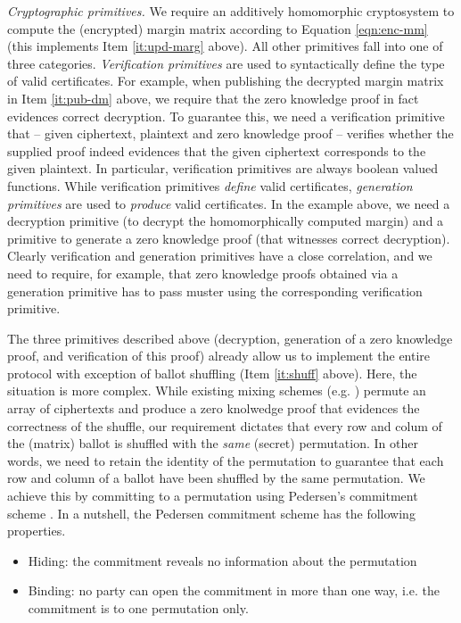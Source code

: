 \smallskip\noindent\emph{Cryptographic primitives.}
We require an additively homomorphic cryptosystem to
compute the (encrypted) margin matrix according to Equation
\ref{eqn:enc-mm} (this implements Item \ref{it:upd-marg} above). All
other primitives fall into one of three categories.
\emph{Verification primitives} are used to syntactically define
the type of valid certificates. For example, when publishing the
decrypted margin matrix in Item \ref{it:pub-dm} above, we require
that the zero knowledge proof in fact evidences correct decryption.
To
guarantee this, we need a verification primitive that -- given
ciphertext, plaintext and zero knowledge proof -- verifies whether the supplied proof
indeed evidences that the given ciphertext corresponds to the given
plaintext. In particular, verification primitives are always boolean
valued functions. While verification primitives \emph{define} valid
certificates, \emph{generation primitives} are used to
\emph{produce} valid certificates. In the example above, we need a
decryption primitive (to decrypt the homomorphically computed
margin) and a primitive to generate a zero knowledge proof (that
witnesses correct decryption). Clearly verification and generation
primitives have a close correlation, and we need to require, for
example, that zero knowledge proofs obtained via a generation
primitive has to pass muster using the corresponding verification
primitive. 

The three primitives described above (decryption, generation of a
zero knowledge proof, and verification of this proof) already allow
us  to implement the entire protocol with exception of ballot
shuffling (Item \ref{it:shuff} above).  Here, the situation is more
complex. While existing mixing schemes (e.g. \citep{Bayer:2012:EZK}) permute 
an array of ciphertexts and produce a zero knolwedge proof that
evidences the correctness of the shuffle, our requirement dictates
that every row and colum of the (matrix) ballot is
shuffled with the \emph{same} (secret) permutation.  In other words,
we need to retain the identity of the permutation to guarantee that
each row and column of a ballot have been shuffled by the same
permutation.
We achieve this by
committing to a permutation using Pedersen's commitment scheme
\citep{Pederson}.
In a nutshell, the Pedersen commitment scheme has the following properties. 
\begin{itemize}
\item Hiding: the commitment reveals no information about the
permutation
\item Binding: no party can open the commitment in more  
	 	than one way, i.e. the commitment is to one permutation only. 
\end{itemize}


